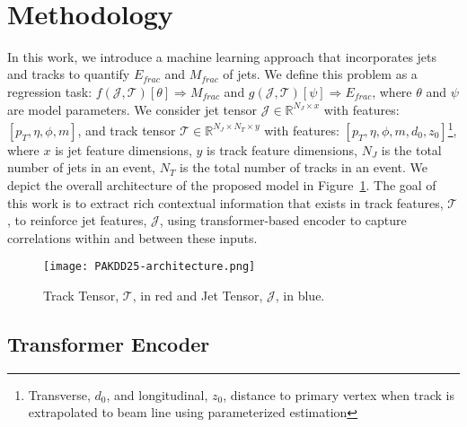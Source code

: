 \hfill\\
\section{Methodology}\hfill

In this work, we introduce a machine learning approach that incorporates jets and tracks to quantify $E_{frac}$ and $M_{frac}$ of jets. We define this problem as a regression task: $f(\mathcal{J},\mathcal{T})[\theta] \Rightarrow M_{frac}$ and $g(\mathcal{J},\mathcal{T})[\psi] \Rightarrow E_{frac}$, where $\theta$ and $\psi$ are model parameters. We consider jet tensor $\mathcal{J} \in \mathbb{R}^{N_J \times x}$ with features: $[p_T,\eta,\phi,m]$, and track tensor $\mathcal{T} \in \mathbb{R}^{N_J \times N_T \times y}$ with features: $[p_T,\eta,\phi,m,d_0,z_0]$\footnote{Transverse, $d_0$, and longitudinal, $z_0$, distance to primary vertex when track is extrapolated to beam line using parameterized estimation}, where $x$ is jet feature dimensions, $y$ is track feature dimensions, $N_J$ is the total number of jets in an event, $N_T$ is the total number of tracks in an event. We depict the overall architecture of the proposed model in Figure~\ref{fig:Model}. The goal of this work is to extract rich contextual information that exists in track features, $\mathcal{T}$, to reinforce jet features, $\mathcal{J}$, using transformer-based encoder to capture correlations within and between these inputs.

\begin{figure}[h]
\centering
  \texttt{[image: PAKDD25-architecture.png]}
\caption{Track Tensor, $\mathcal{T}$, in red and Jet Tensor, $\mathcal{J}$, in blue.}
\label{fig:Model}
\end{figure}


\subsection{Transformer Encoder} \hfill

